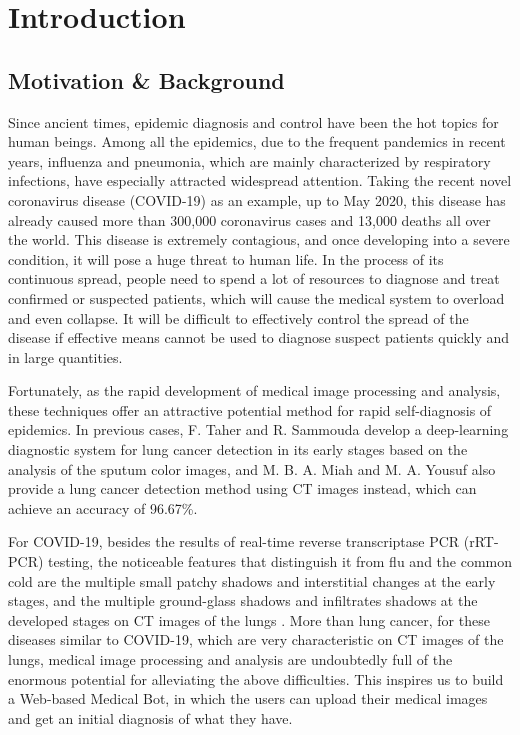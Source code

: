 \documentclass[11pt,bibliography=totocnumbered]{article}
\begin{document}
	\tableofcontents
	\newpage
  
  \section{Introduction}
  
  \subsection{Motivation \& Background}
  
  Since ancient times, epidemic diagnosis and control have been the hot topics for human beings. Among all the epidemics, due to the frequent pandemics in recent years, influenza and pneumonia, which are mainly characterized by respiratory infections, have especially attracted widespread attention. Taking the recent novel coronavirus disease (COVID-19) as an example, up to May 2020, this disease has already caused more than 300,000 coronavirus cases and 13,000 deaths all over the world. This disease is extremely contagious, and once developing into a severe condition, it will pose a huge threat to human life. In the process of its continuous spread, people need to spend a lot of resources to diagnose and treat confirmed or suspected patients, which will cause the medical system to overload and even collapse. It will be difficult to effectively control the spread of the disease if effective means cannot be used to diagnose suspect patients quickly and in large quantities.
  
  Fortunately, as the rapid development of medical image processing and analysis, these techniques offer an attractive potential method for rapid self-diagnosis of epidemics. In previous cases, F. Taher and R. Sammouda \cite{5752535} develop a deep-learning diagnostic system for lung cancer detection in its early stages based on the analysis of the sputum color images, and M. B. A. Miah and M. A. Yousuf \cite{7307530} also provide a lung cancer detection method using CT images instead, which can achieve an accuracy of 96.67\%.
  
  For COVID-19, besides the results of real-time reverse transcriptase PCR (rRT-PCR) testing, the noticeable features that distinguish it from flu and the common cold are the multiple small patchy shadows and interstitial changes at the early stages, and the multiple ground-glass shadows and infiltrates shadows at the developed stages on CT images of the lungs \cite{COVID-19}. More than lung cancer, for these diseases similar to COVID-19, which are very characteristic on CT images of the lungs, medical image processing and analysis are undoubtedly full of the enormous potential for alleviating the above difficulties. 
  This inspires us to build a Web-based Medical Bot, in which the users can upload their medical images and get an initial diagnosis of what they have. 
  
\end{document}
